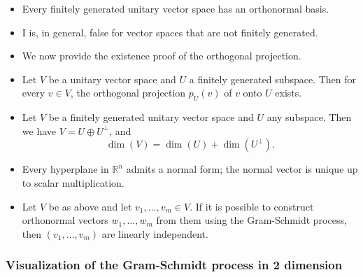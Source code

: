 \begin{itemize}[label=\(-\)]

    \item Every finitely generated unitary vector space has an orthonormal basis.

    \item I is, in general, false for vector spaces that are not finitely generated.

    \item We now provide the existence proof of the orthogonal projection.

    \item Let \( V \) be a unitary vector space and \( U \) a finitely generated subspace. Then for every \( v \in V \), the orthogonal projection \( p_U(v) \) of \( v \) onto \( U \) exists.
    
    \item Let \( V \) be a finitely generated unitary vector space and \( U \) any subspace. Then we have \( V = U \oplus U^\perp \), and
    \[
    \dim(V) = \dim(U) + \dim(U^\perp).
    \]
    
    \item Every hyperplane in \( \mathbb{R}^n \) admits a normal form; the normal vector is unique up to scalar multiplication.
    
    \item Let \( V \) be as above and let \( v_1, \ldots, v_m \in V \). If it is possible to construct orthonormal vectors \( w_1, \ldots, w_m \) from them using the Gram-Schmidt process, then \( (v_1, \ldots, v_m) \) are linearly independent.
    
\end{itemize}


\subsubsection*{Visualization of the Gram-Schmidt process in 2 dimension}

\begin{center}
\end{center}

